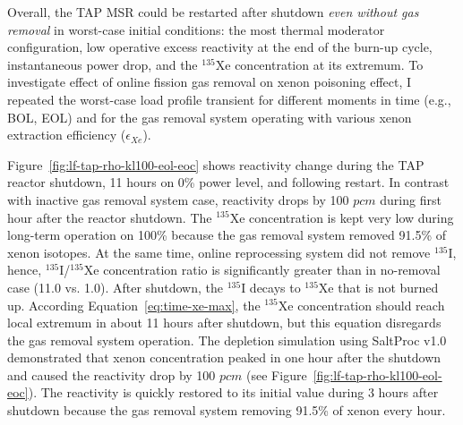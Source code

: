 Overall, the \gls{TAP} \gls{MSR} could be restarted after shutdown \emph{even 
without gas removal} 
in worst-case initial conditions: the most thermal moderator configuration, 
low operative excess reactivity at the end of the burn-up cycle, instantaneous 
power drop, and the $^{135}$Xe concentration at its extremum. To investigate 
effect of online fission gas removal on xenon poisoning effect, I repeated the 
worst-case load profile transient for different moments in time (e.g., 
\gls{BOL}, \gls{EOL}) and for the gas removal system operating with various 
xenon extraction efficiency ($\epsilon_{Xe}$). 

Figure~\ref{fig:lf-tap-rho-kl100-eol-eoc} shows reactivity change during the
\gls{TAP} reactor shutdown, 11 hours on 0\% power level, and following 
restart. In contrast with inactive gas removal system case, reactivity drops 
by 100 $pcm$ during first hour after the reactor shutdown. The $^{135}$Xe 
concentration is kept very low during long-term operation on 100\% because the 
gas removal system removed 91.5\% of xenon isotopes. At the same time, online 
reprocessing system did not remove $^{135}$I, hence, $^{135}$I/$^{135}$Xe 
concentration ratio is significantly greater than in no-removal case (11.0 vs. 
1.0). After shutdown, the $^{135}$I decays to $^{135}$Xe that 
is not burned up. According Equation~\ref{eq:time-xe-max}, the $^{135}$Xe 
concentration should reach local extremum in about 11 hours after shutdown, 
but this equation disregards the gas removal system operation. The depletion 
simulation using SaltProc v1.0 demonstrated that xenon concentration peaked in 
one hour after the shutdown and caused the reactivity drop by 100 $pcm$ (see 
Figure~\ref{fig:lf-tap-rho-kl100-eol-eoc}). The reactivity is quickly restored 
to its initial value during 3 hours after shutdown because the gas removal 
system removing 91.5\% of xenon every hour.

